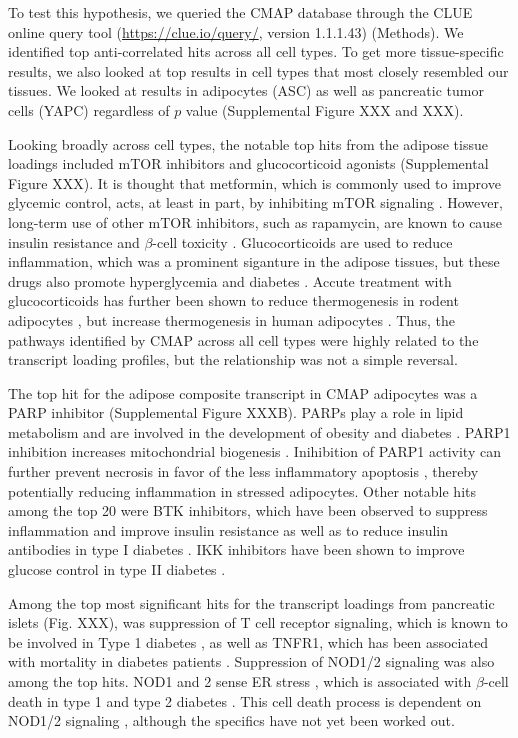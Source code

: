 \documentclass[
]{article}
\begin{document}
To test this hypothesis, we queried the CMAP database through the CLUE
online query tool (\url{https://clue.io/query/}, version 1.1.1.43)
(Methods). We identified top anti-correlated hits across all cell types.
To get more tissue-specific results, we also looked at top results in
cell types that most closely resembled our tissues. We looked at results
in adipocytes (ASC) as well as pancreatic tumor cells (YAPC) regardless
of \(p\) value (Supplemental Figure XXX and XXX).

Looking broadly across cell types, the notable top hits from the adipose
tissue loadings included mTOR inhibitors and glucocorticoid agonists
(Supplemental Figure XXX). It is thought that metformin, which is
commonly used to improve glycemic control, acts, at least in part, by
inhibiting mTOR signaling \cite{pmid30290005, 
pmid30034573}. However, long-term use of other mTOR inhibitors, such as
rapamycin, are known to cause insulin resistance and \(\beta\)-cell
toxicity \cite{pmid30034573, pmid23881200, pmid21266327}.
Glucocorticoids are used to reduce inflammation, which was a prominent
siganture in the adipose tissues, but these drugs also promote
hyperglycemia and diabetes \cite{pmid24582093, pmid35585199}. Accute
treatment with glucocorticoids has further been shown to reduce
thermogenesis in rodent adipocytes \cite{pmid30310815, 
pmid11254472, pmid23197361}, but increase thermogenesis in human
adipocytes \cite{pmid27411014, pmid25385872}. Thus, the pathways
identified by CMAP across all cell types were highly related to the
transcript loading profiles, but the relationship was not a simple
reversal.

The top hit for the adipose composite transcript in CMAP adipocytes was
a PARP inhibitor (Supplemental Figure XXXB). PARPs play a role in lipid
metabolism and are involved in the development of obesity and diabetes
\cite{pmid34450194}. PARP1 inhibition increases mitochondrial biogenesis
\cite{pmid21459330}. Inihibition of PARP1 activity can further prevent
necrosis in favor of the less inflammatory apoptosis
\cite{pmid12114611}, thereby potentially reducing inflammation in
stressed adipocytes. Other notable hits among the top 20 were BTK
inhibitors, which have been observed to suppress inflammation and
improve insulin resistance \cite{pmid33648925} as well as to reduce
insulin antibodies in type I diabetes \cite{pmid28753229}. IKK
inhibitors have been shown to improve glucose control in type II
diabetes \cite{pmid28683283, pmid15685170}.

Among the top most significant hits for the transcript loadings from
pancreatic islets (Fig. XXX), was suppression of T cell receptor
signaling, which is known to be involved in Type 1 diabetes
\cite{pmid33603744}, as well as TNFR1, which has been associated with
mortality in diabetes patients \cite{pmid32281000}. Suppression of
NOD1/2 signaling was also among the top hits. NOD1 and 2 sense ER stress
\cite{pmid27007849, pmid28823510}, which is associated with
\(\beta\)-cell death in type 1 and type 2 diabetes \cite{pmid24520198}.
This cell death process is dependent on NOD1/2 signaling
\cite{pmid27007849}, although the specifics have not yet been worked
out.
\end{document}
